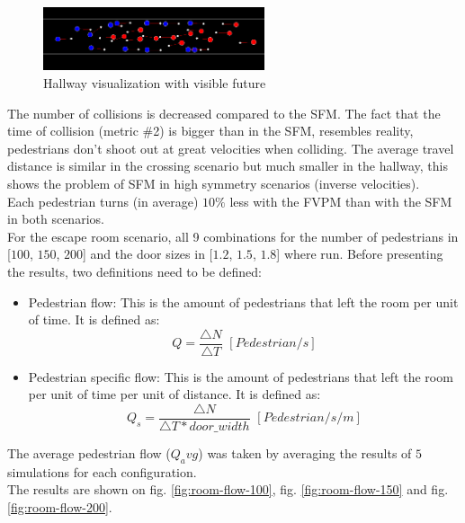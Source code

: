 \documentclass[english]{article}
\begin{document}
    \begin{figure}[H]
        \begin{centering}
        \includegraphics[width=6.5cm]{pics/program/hallway-future} 
        \par\end{centering}
        
        \caption{\label{fig:hallway-future}Hallway visualization with visible future}
    \end{figure}
    
    The number of collisions is decreased compared to the SFM. The fact
    that the time of collision (metric \#2) is bigger than in the SFM,
    resembles reality, pedestrians don't shoot out at great velocities
    when colliding. The average travel distance is similar in the crossing
    scenario but much smaller in the hallway, this shows the problem of
    SFM in high symmetry scenarios (inverse velocities). \\
     Each pedestrian turns (in average) $10\%$ less with the FVPM than
    with the SFM in both scenarios. \\

    For the escape room scenario, all 9 combinations for the number of pedestrians in [$100$, $150$, $200$] 
    and the door sizes in [$1.2$, $1.5$, $1.8$] where run.
    Before presenting the results, two definitions need to be defined:
    \begin{itemize}
        \item Pedestrian flow: This is the amount of pedestrians that left the room
        per unit of time. It is defined as: 
        \[
            Q=\frac{\triangle N}{\triangle T}\,\,[Pedestrian/s]
        \]
         
        \item Pedestrian specific flow: This is the amount of pedestrians that left
        the room per unit of time per unit of distance. It is defined as:
        \[
            Q_{s}=\frac{\triangle N}{\triangle T*door\_width}\,\,[Pedestrian/s/m]
        \]
    \end{itemize}

    
    The average pedestrian flow ($Q_avg$) was taken by averaging the results of $5$ simulations for each configuration.\\
    The results are shown on fig. \ref{fig:room-flow-100}, fig. \ref{fig:room-flow-150} and fig. 
    \ref{fig:room-flow-200}.
\end{document}
